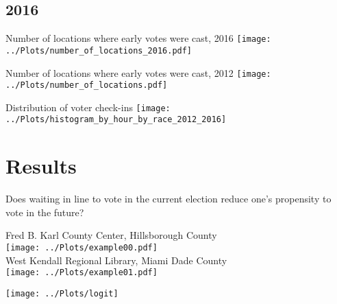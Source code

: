 \documentclass{beamer}
\begin{document}
		\subsection{2016}
		
		
		\begin{frame}				
		\end{frame}
		
		\begin{frame}				
		\centering 
		Number of locations where early votes were cast, 2016
		\texttt{[image: ../Plots/number\_of\_locations\_2016.pdf]}
		\end{frame}
		
		\begin{frame}				
		\centering 
		Number of locations where early votes were cast, 2012
		\texttt{[image: ../Plots/number\_of\_locations.pdf]}
		\end{frame}
		
		\begin{frame}				
			\centering 
			Distribution of voter check-ins
		\texttt{[image: ../Plots/histogram\_by\_hour\_by\_race\_2012\_2016]}
		\end{frame}


		
		
		
		\section{Results}
	
		\begin{frame}
		Does waiting in line to vote in the current election reduce one's propensity to vote in the future?
		\end{frame}

		\begin{frame}				
			\centering 
			Fred B. Karl County Center, Hillsborough County\\
			\texttt{[image: ../Plots/example00.pdf]} \\
			West Kendall Regional Library, Miami Dade County\\
			\texttt{[image: ../Plots/example01.pdf]} \\ 
		\end{frame}
	
		\begin{frame}
		\centering 
		\texttt{[image: ../Plots/logit]}			
		\end{frame}
\end{document}
